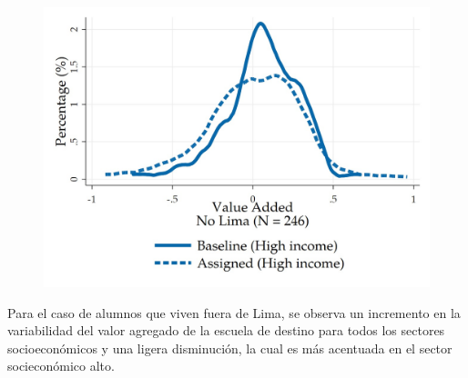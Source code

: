 \documentclass[11pt]{article}
\numberwithin{equation}{section}
\begin{document}
\begin{figure}[!htb]
\begin{minipage}[b]{0.99\textwidth}
            \includegraphics[width=\linewidth]{figures/NoLimaHI.jpeg}
            \label{fig:LimaHI}
        \endminipage
    \end{minipage}
\end{figure}
Para el caso de alumnos que viven fuera de Lima, se observa un incremento en la variabilidad del valor agregado de la escuela de destino para todos los sectores socioecon\'omicos y una ligera disminuci\'on, la cual es m\'as acentuada en el sector sociecon\'omico alto.  

\end{document}
